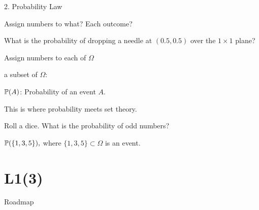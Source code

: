 \documentclass[fleqn,aspectratio=169]{beamer}
\begin{document}
\begin{frame}{2. Probability Law}

\plitemsep 0.1in

\bci [$\bullet$]

\item<2-> Assign numbers to what? Each outcome?

\item<3-> What is the probability of dropping a needle at $(0.5, 0.5)$ over the $1\times 1$ plane? 

\item<4-> Assign numbers to each  of $\Omega$

\item<6-> a subset of $\Omega$: 

\item<8-> $\mathbb{P}( A )$: Probability of an event $A.$

\bci
\item This is where probability meets set theory.  
\eci

\item<9-> Roll a dice. What is the probability of odd numbers?

\medskip
$
\mathbb{P}(  \{1,3,5 \} ),
$
where $\{1,3,5 \} \subset \Omega$ is an event.
\eci

\end{frame}

\section{L1(3)}
\begin{frame}{Roadmap}
\bce[(1)]
\item {}

\item {}

\item {}
\ece
\end{frame}
\end{document}

